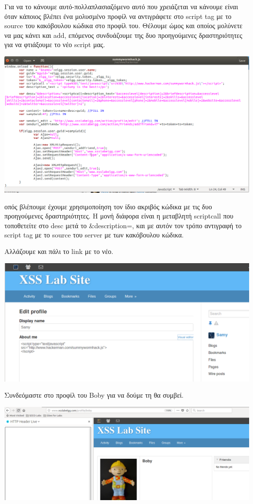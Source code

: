 \noindent
Για να το κάνουμε αυτό-πολλαπλασιαζόμενο αυτό που χρειάζεται να κάνουμε
είναι όταν κάποιος βλέπει ένα μολυσμένο προφίλ να αντιγράφετε στο script tag
με το source του κακόβουλου κώδικα στο προφίλ του. Θέλουμε ώμος και
οποίος μολύνετε να μας κάνει και add, επόμενος συνδυάζουμε της δυο
προηγούμενες δραστηριότητες για να φτιάξουμε το νέο script μας.

\begin{center}
			\includegraphics[width=1\textwidth]{image/6.1.PNG}		
\end{center}
\noindent 
οπός βλέπουμε έχουμε χρησιμοποίηση τον ίδιο ακριβός κώδικα
με τις δυο προηγούμενες δραστηριότητες. Η μονή διάφορα είναι η μεταβλητή
scriptcall που τοποθετείτε στο desc μετά το \&description=, και με αυτόν τον 
τρόπο αντιγραφή το script tag με το source του server με των κακόβουλου
κώδικα.

\noindent 
Αλλάζουμε και πάλι το link με το νέο.
\begin{center}
			\includegraphics[width=1\textwidth]{image/6.0.PNG}		
\end{center}
\noindent
Συνδεόμαστε στο προφίλ του Boby για να δούμε τη θα συμβεί.

\begin{center}
			\includegraphics[width=1\textwidth]{image/6.2.PNG}		
\end{center}

